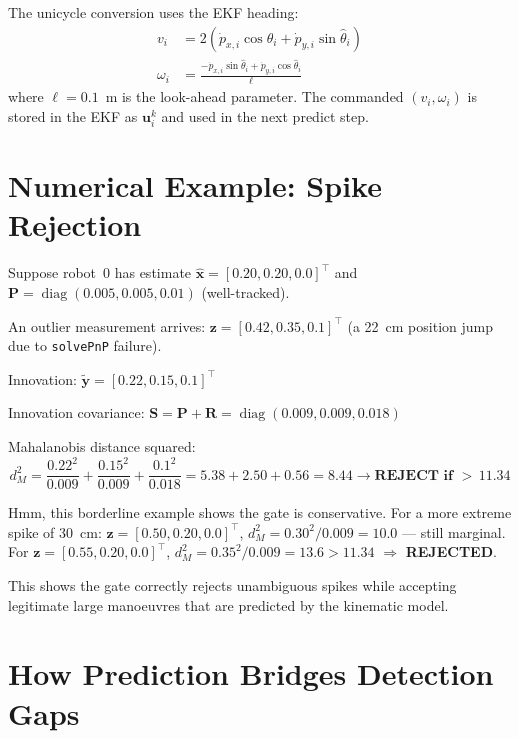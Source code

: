 \documentclass[12pt,a4paper]{article}
\begin{document}
The unicycle conversion uses the EKF heading:
\begin{align}
  v_i &= 2\left(\dot{p}_{x,i}\cos\hat{\theta}_i + \dot{p}_{y,i}\sin\hat{\theta}_i\right) \\
  \omega_i &= \frac{-\dot{p}_{x,i}\sin\hat{\theta}_i + \dot{p}_{y,i}\cos\hat{\theta}_i}{\ell}
\end{align}
where $\ell = 0.1$~m is the look-ahead parameter. The commanded $(v_i, \omega_i)$
is stored in the EKF as $\bm{u}_i^k$ and used in the next predict step.

\section{Numerical Example: Spike Rejection}
\label{sec:example}

Suppose robot~0 has estimate $\hat{\bm{x}} = [0.20, 0.20, 0.0]^\top$ and
$\bm{P} = \operatorname{diag}(0.005, 0.005, 0.01)$ (well-tracked).

An outlier measurement arrives: $\bm{z} = [0.42, 0.35, 0.1]^\top$
(a 22~cm position jump due to \texttt{solvePnP} failure).

Innovation: $\tilde{\bm{y}} = [0.22, 0.15, 0.1]^\top$

Innovation covariance:
$\bm{S} = \bm{P} + \bm{R} = \operatorname{diag}(0.009, 0.009, 0.018)$

Mahalanobis distance squared:
\begin{equation}
  d_M^2 = \frac{0.22^2}{0.009} + \frac{0.15^2}{0.009} + \frac{0.1^2}{0.018}
         = 5.38 + 2.50 + 0.56 = \mathbf{8.44 \to \text{REJECT if } {>}\,11.34}
\end{equation}

Hmm, this borderline example shows the gate is conservative. For a more extreme
spike of 30~cm: $\bm{z} = [0.50, 0.20, 0.0]^\top$,
$d_M^2 = 0.30^2/0.009 = 10.0$ --- still marginal. For $\bm{z} = [0.55, 0.20, 0.0]^\top$,
$d_M^2 = 0.35^2/0.009 = 13.6 > 11.34$ $\Rightarrow$ \textbf{REJECTED}.

This shows the gate correctly rejects unambiguous spikes while accepting
legitimate large manoeuvres that are predicted by the kinematic model.

\section{How Prediction Bridges Detection Gaps}
\label{sec:bridge}
\end{document}
